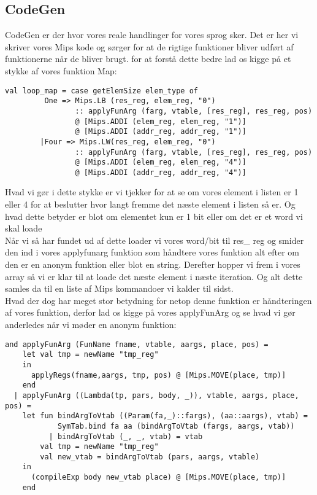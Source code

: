 \documentclass[a4paper]{article}
\begin{document}
\subsection{CodeGen}
CodeGen er der hvor vores reale handlinger for vores sprog sker. Det er her vi skriver vores Mips kode og sørger for at de rigtige funktioner bliver udført af funktionerne når de bliver brugt. for at forstå dette bedre lad os kigge på et stykke af vores funktion Map:
\begin{lstlisting}
val loop_map = case getElemSize elem_type of
         One => Mips.LB (res_reg, elem_reg, "0")
                :: applyFunArg (farg, vtable, [res_reg], res_reg, pos)
                @ [Mips.ADDI (elem_reg, elem_reg, "1")]
                @ [Mips.ADDI (addr_reg, addr_reg, "1")]
        |Four => Mips.LW(res_reg, elem_reg, "0")
                :: applyFunArg (farg, vtable, [res_reg], res_reg, pos)
                @ [Mips.ADDI (elem_reg, elem_reg, "4")]
                @ [Mips.ADDI (addr_reg, addr_reg, "4")]
\end{lstlisting}
Hvad vi gør i dette stykke er vi tjekker for at se om vores element i listen er 1 eller 4 for at beslutter hvor langt fremme det næste element i listen så er. Og hvad dette betyder er blot om elementet kun er 1 bit eller om det er et word vi skal loade\\
Når vi så har fundet ud af dette loader vi vores word/bit til res\_ reg og smider den ind i vores applyfunarg funktion som håndtere vores funktion alt efter om den er en anonym funktion eller blot en string. Derefter hopper vi frem i vores array så vi er klar til at loade det næste element i næste iteration. Og alt dette samles da til en liste af Mips kommandoer vi kalder til sidst.\\[0.1in]
Hvad der dog har meget stor betydning for netop denne funktion er håndteringen af vores funktion, derfor lad os kigge på vores applyFunArg og se hvad vi gør anderledes når vi møder en anonym funktion:
\begin{lstlisting}
and applyFunArg (FunName fname, vtable, aargs, place, pos) =
    let val tmp = newName "tmp_reg"
    in
      applyRegs(fname,aargs, tmp, pos) @ [Mips.MOVE(place, tmp)]
    end
  | applyFunArg ((Lambda(tp, pars, body, _)), vtable, aargs, place, pos) =
    let fun bindArgToVtab ((Param(fa,_)::fargs), (aa::aargs), vtab) =
            SymTab.bind fa aa (bindArgToVtab (fargs, aargs, vtab))
          | bindArgToVtab (_, _, vtab) = vtab
        val tmp = newName "tmp_reg"
        val new_vtab = bindArgToVtab (pars, aargs, vtable)
    in
      (compileExp body new_vtab place) @ [Mips.MOVE(place, tmp)]
    end
\end{lstlisting}
\end{document}
